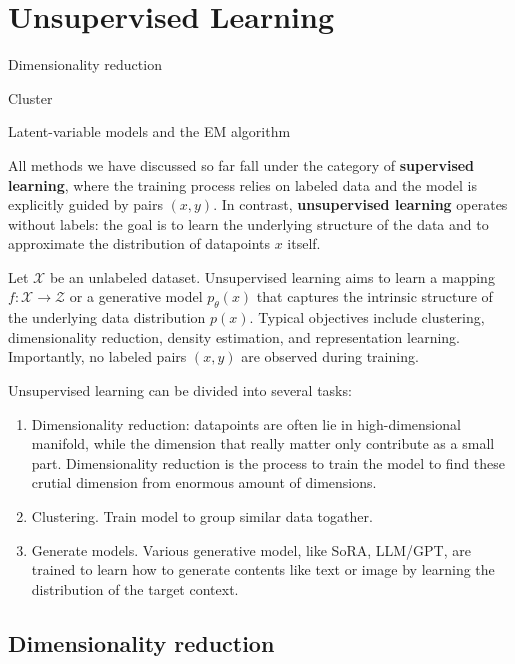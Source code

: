 \documentclass[../main]{subfiles}
\begin{document}
\chapter{Unsupervised Learning}
\begin{introduction}
    \item Dimensionality reduction
    \item Cluster
    \item Latent-variable models and the EM algorithm
\end{introduction}
All methods we have discussed so far fall under the category of \textbf{supervised learning}, where the training process relies on labeled data and the model is explicitly guided by pairs $(x,y)$.  
In contrast, \textbf{unsupervised learning} operates without labels: the goal is to learn the underlying structure of the data and to approximate the distribution of datapoints $x$ itself.

\begin{definition}
    Let $\mathcal{X}$ be an unlabeled dataset.  
    Unsupervised learning aims to learn a mapping $f:\mathcal{X}\to\mathcal{Z}$ or a generative model $p_\theta(x)$ that captures the intrinsic structure of the underlying data distribution $p(x)$.  
    Typical objectives include clustering, dimensionality reduction, density estimation, and representation learning.  
    Importantly, no labeled pairs $(x,y)$ are observed during training.
\end{definition}

Unsupervised learning can be divided into several tasks:
\begin{enumerate}
    \item Dimensionality reduction: datapoints are often lie in high-dimensional manifold, while the dimension that really matter only contribute as a small part. Dimensionality reduction is the process to train the model to find these crutial dimension from enormous amount of dimensions.
    \item Clustering. Train model to group similar data togather.
    \item Generate models. Various generative model, like SoRA, LLM/GPT, are trained to learn how to generate contents like text or image by learning the distribution of the target context.
\end{enumerate}
\section{Dimensionality reduction}
\end{document}
